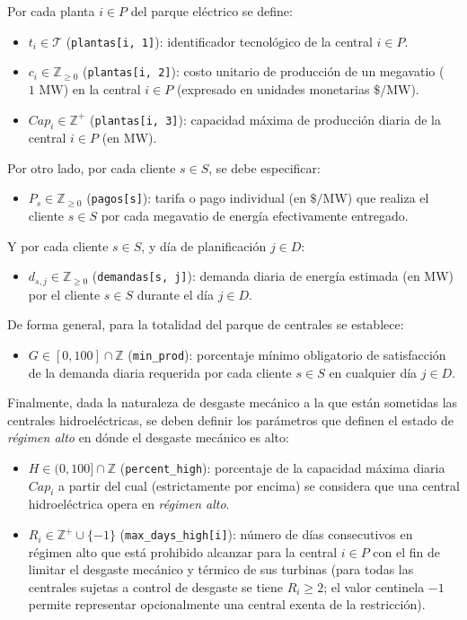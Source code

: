 \begin{itemize}
    Por cada planta $i \in P$ del parque eléctrico se define:
    \begin{itemize}
        \item $t_i \in \mathcal{T}$ (\texttt{plantas[i, 1]}): identificador tecnológico de la central $i \in P$.
        \item $c_i \in \mathbb{Z}_{\ge 0}$ (\texttt{plantas[i, 2]}): costo unitario de producción de un megavatio ($1\text{ MW}$) en la central $i \in P$ (expresado en unidades monetarias $\$/\text{MW}$).
        \item $Cap_i \in \mathbb{Z}^+$ (\texttt{plantas[i, 3]}): capacidad máxima de producción diaria de la central $i \in P$ (en $\text{MW}$).
    \end{itemize}
    Por otro lado, por cada cliente $s \in S$, se debe especificar:
    \begin{itemize}
        \item $P_s \in \mathbb{Z}_{\ge 0}$ (\texttt{pagos[s]}): tarifa o pago individual (en $\$/\text{MW}$) que realiza el cliente $s \in S$ por cada megavatio de energía efectivamente entregado.
    \end{itemize}
    Y por cada cliente $s \in S$, y día de planificación $j \in D$:
    \begin{itemize}
        \item $d_{s,j} \in \mathbb{Z}_{\ge 0}$ (\texttt{demandas[s, j]}): demanda diaria de energía estimada (en $\text{MW}$) por el cliente $s \in S$ durante el día $j \in D$.
    \end{itemize}
    De forma general, para la totalidad del parque de centrales se establece:
    \begin{itemize}
        \item $G \in [0, 100] \cap \mathbb{Z}$ (\texttt{min\_prod}): porcentaje mínimo obligatorio de satisfacción de la demanda diaria requerida por cada cliente $s \in S$ en cualquier día $j \in D$. 
    \end{itemize}
    Finalmente, dada la naturaleza de desgaste mecánico a la que están sometidas las centrales hidroeléctricas, se deben definir los parámetros que definen el estado de \textit{régimen alto} en dónde el desgaste mecánico es alto:
    \begin{itemize}
        \item $H \in (0, 100] \cap \mathbb{Z}$ (\texttt{percent\_high}): porcentaje de la capacidad máxima diaria $Cap_i$ a partir del cual (estrictamente por encima) se considera que una central hidroeléctrica opera en \emph{régimen alto}.
        \item $R_i \in \mathbb{Z}^+ \cup \{-1\}$ (\texttt{max\_days\_high[i]}): número de días consecutivos en régimen alto que está prohibido alcanzar para la central $i \in P$ con el fin de limitar el desgaste mecánico y térmico de sus turbinas (para todas las centrales sujetas a control de desgaste se tiene $R_i \ge 2$; el valor centinela $-1$ permite representar opcionalmente una central exenta de la restricción).
    \end{itemize}


\end{itemize}

